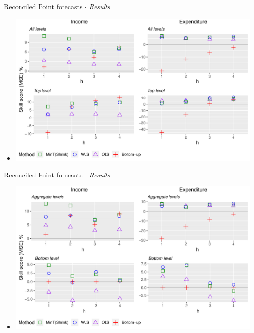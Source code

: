 \documentclass[11pt,xcolor=dvipsnames,handout]{beamer} %
\begin{document}
\begin{frame}{Reconciled Point forecasts - \textit{Results}}
\begin{itemize}[<+-| alert@+>]
	\item[] 
	\tiny
	\centering
		\includegraphics[scale=0.55]{Figs/Results/PointF_MSE_AllandToplevel.pdf}
	
	
\end{itemize}
\end{frame}



\begin{frame}{Reconciled Point forecasts - \textit{Results}}
\begin{itemize}[<+-| alert@+>]
	\item[] 
	\tiny
	\centering
	\includegraphics[scale=0.55]{Figs/Results/PointF_MSE_AggandDisagg.pdf}
	
	
\end{itemize}
\end{frame}
\end{document}
